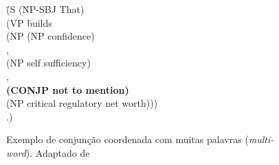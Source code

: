 \begin{figure}[!h]
    \centering
    \begin{minipage}{10cm}
        \begin{tabbing}
            \=(S (\=NP-SBJ That)\+\\
                \>(VP \=builds\+\\
                    \>(NP (NP confidence)\\
                    \>,\\
                    \>(NP self sufficiency)\\
                    \>,\\
                    \>\textbf{(CONJP not to mention)}\\
                    \>(NP critical regulatory net worth)))\-\\
                \>.)
        \end{tabbing}
    \end{minipage}
    \caption[Exemplo de conjunção coordenada \textit{multi-word}]{Exemplo de conjunção coordenada com muitas palavras (\textit{multi-word}). Adaptado de }
    \label{fig:ptb_conj_exe_2}
\end{figure}